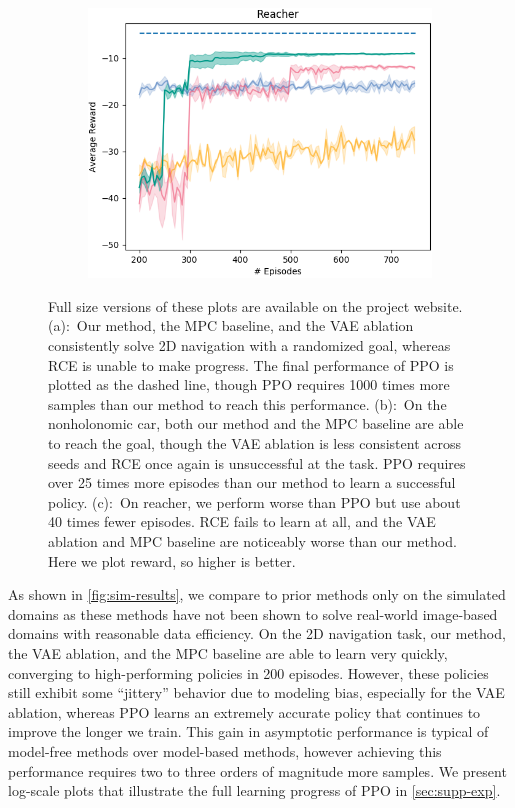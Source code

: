 \begin{figure}
\begin{subfigure}{0.33\linewidth}
        \includegraphics[width=\linewidth]{img/solar/reacher-lin.png}
        \caption{}
    \end{subfigure}
    \caption[Results of \metabbr\ on simulated tasks]{Full size versions of these plots are available on the project website. (a):~Our method, the MPC baseline, and the VAE ablation consistently solve 2D navigation with a randomized goal, whereas RCE is unable to make progress. The final performance of PPO is plotted as the dashed line, though PPO requires 1000 times more samples than our method to reach this performance. (b):~On the nonholonomic car, both our method and the MPC baseline are able to reach the goal, though the VAE ablation is less consistent across seeds and RCE once again is unsuccessful at the task. PPO requires over 25 times more episodes than our method to learn a successful policy. (c):~On reacher, we perform worse than PPO but use about 40 times fewer episodes. RCE fails to learn at all, and the VAE ablation and MPC baseline are noticeably worse than our method. Here we plot reward, so higher is better.}
    \label{fig:sim-results}
    \vspace{-.5em}
\end{figure}

As shown in \autoref{fig:sim-results}, we compare to prior methods only on the simulated domains as these methods have not been shown to solve real-world image-based domains with reasonable data efficiency. On the 2D navigation task, our method, the VAE ablation, and the MPC baseline are able to learn very quickly, converging to high-performing policies in 200 episodes. However, these policies still exhibit some ``jittery'' behavior due to modeling bias, especially for the VAE ablation, whereas PPO learns an extremely accurate policy that continues to improve the longer we train. This gain in asymptotic performance is typical of model-free methods over model-based methods, however achieving this performance requires two to three orders of magnitude more samples. We present log-scale plots that illustrate the full learning progress of PPO in \autoref{sec:supp-exp}.

